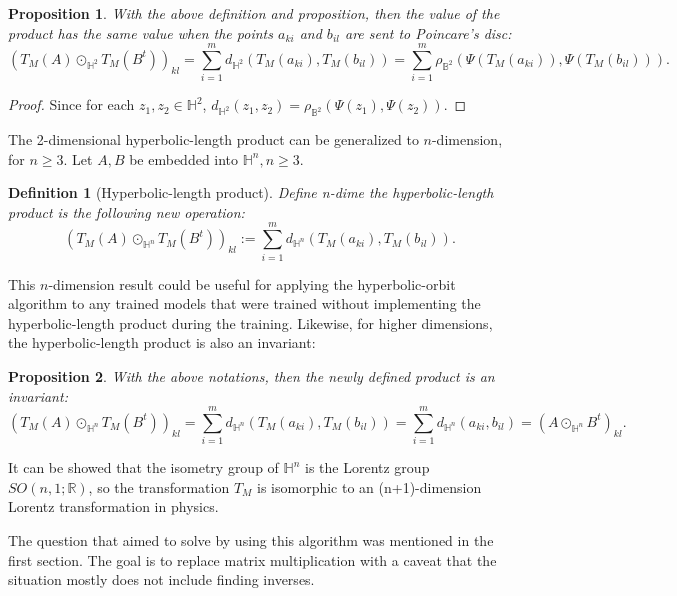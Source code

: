 \documentclass{article}
\theoremstyle{plain}
\theoremstyle{plain} %
\newtheorem{proposition}{Proposition}
\newtheorem{definition}[theorem]{Definition}
\theoremstyle{definition}  %
\theoremstyle{remark}  %
\theoremstyle{plain}
\begin{document}
\begin{proposition}
With the above definition and proposition, then the value of the product has the same value when the points $a_{ki}$ and $b_{il}$ are sent to Poincare's disc:
$$
\left( T_M(A) \odot_{\mathbb{H}^2} T_M(B^t)\right)_{kl} = \sum\limits_{i=1}^m d_{\mathbb{H}^2} \left(T_M \left( a_{ki} \right) ,T_M\left( b_{il}\right) \right)
=  \sum\limits_{i=1}^m \rho_{\mathbb{B}^2} \left(\Psi \left(T_M \left( a_{ki} \right)\right) ,\Psi\left( T_M\left( b_{il}\right) \right)\right) .$$
\end{proposition}
\begin{proof}
Since for each $z_1,z_2\in\mathbb{H}^2$, $d_{\mathbb{H}^2}(z_1,z_2)=\rho_{\mathbb{B}^2}(\Psi(z_1),\Psi(z_2)).$
\end{proof}

The 2-dimensional hyperbolic-length product can be generalized to $n$-dimension\cite{MR1138441, MR725161, beardon2012geometry, MR2402415, MR4221225, MR1893917}, for $n\geq 3$. Let $A, B$ be embedded into $\mathbb{H}^n, n\geq 3.$
\begin{definition}[Hyperbolic-length product]
Define \textit{n-dime the hyperbolic-length product} is the following new operation:
$$
\left( T_M(A) \odot_{\mathbb{H}^n} T_M(B^t)\right)_{kl} := \sum\limits_{i=1}^m d_{\mathbb{H}^n} \left(T_M \left( a_{ki} \right) ,T_M\left( b_{il}\right) \right).
$$
\end{definition}
This $n$-dimension result could be useful for applying the hyperbolic-orbit algorithm to any trained models that were trained without implementing the hyperbolic-length product during the training.
Likewise, for higher dimensions, the hyperbolic-length product is also an invariant:
\begin{proposition}
With the above notations, then the newly defined product is an invariant:
$$
\left( T_M(A) \odot_{\mathbb{H}^n} T_M(B^t)\right)_{kl} = \sum\limits_{i=1}^m d_{\mathbb{H}^n} \left(T_M \left( a_{ki} \right) ,T_M\left( b_{il}\right) \right)
=  \sum\limits_{i=1}^m d_{\mathbb{H}^n} \left( a_{ki}  , b_{il} \right)  =\left( A\odot_{\mathbb{H}^n} B^t\right)_{kl}.$$
\end{proposition}

It can be showed that the isometry group of $\mathbb{H}^n$ is the Lorentz group $SO(n,1;\mathbb{R})$, so the transformation $T_M$ is isomorphic to an (n+1)-dimension Lorentz transformation in physics.


The question that aimed to solve by using this algorithm was mentioned in the first section. The goal is to replace matrix multiplication with a caveat that the situation mostly does not include finding inverses.
\end{document}
